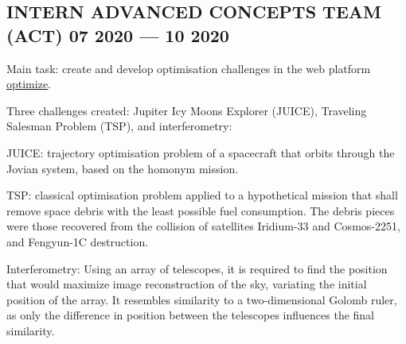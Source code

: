 \documentclass[letter,10pt]{article}
\begin{document}
\subsection{{INTERN ADVANCED CONCEPTS TEAM (ACT) \hfill 07 2020  --- 10 2020}}
\begin{zitemize}
\item Main task: create and develop optimisation challenges in the web platform \href{https://optimize.esa.int/}{optimize}.
\item Three challenges created: Jupiter Icy Moons Explorer (JUICE), Traveling Salesman Problem (TSP), and interferometry: \begin{zitemize}
    \item JUICE: trajectory optimisation problem of a spacecraft that orbits through the Jovian system, based on the homonym  mission.
    \item TSP: classical optimisation problem applied to a hypothetical mission that shall remove space debris with the least possible fuel consumption. The debris pieces were those recovered from the collision of satellites Iridium-33  and Cosmos-2251, and Fengyun-1C destruction.
    \item Interferometry: Using an array of telescopes, it is required to find the position that would maximize image reconstruction of the sky, variating the initial position of the array. It resembles similarity to a two-dimensional Golomb ruler, as only the difference in position between the telescopes influences the final similarity.
\end{zitemize}

\end{zitemize}

\end{document}
